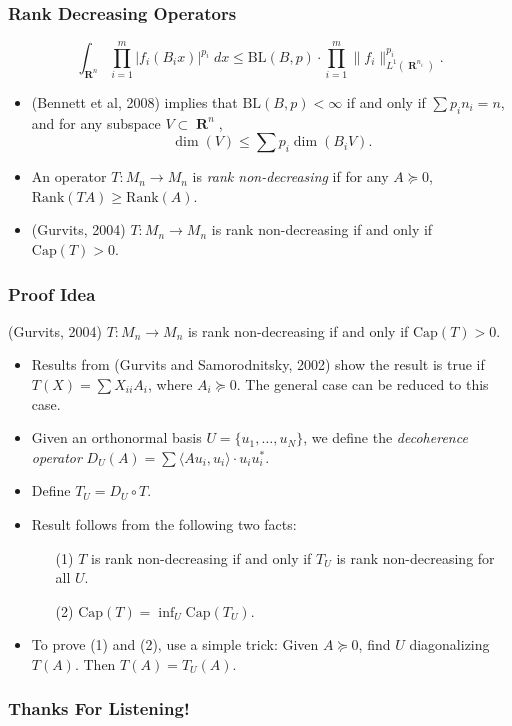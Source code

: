\documentclass[usenames,dvipsnames,12pt]{beamer}
\DeclareMathOperator{\RR}{\mathbf{R}}
\begin{document}
\begin{frame}
    \frametitle{Rank Decreasing Operators}

    \[ \int_{\RR^n} \prod_{i = 1}^m |f_i(B_i x)|^{p_i}\; dx \leq \text{BL}(B,p) \cdot \prod_{i=1}^m \| f_i \|_{L^1(\RR^{n_i})}^{p_i}.  \]

    \begin{itemize}
        \pause
        \item (Bennett et al, 2008) implies that $\text{BL}(B,p) < \infty$ if and only if $\sum p_i n_i = n$, and for any subspace $V \subset \RR^n$,
        \[ \dim(V) \leq \sum p_i \dim(B_i V). \]

        \pause
        \item An operator $T: M_n \to M_n$ is \emph{rank non-decreasing} if for any $A \succeq 0$, $\text{Rank}(TA) \geq \text{Rank}(A)$.

        \pause
        \item (Gurvits, 2004) $T: M_n \to M_n$ is rank non-decreasing if and only if $\text{Cap}(T) > 0$.
    \end{itemize}
\end{frame}


\begin{frame}
    \frametitle{Proof Idea}

    (Gurvits, 2004) $T: M_n \to M_n$ is rank non-decreasing if and only if $\text{Cap}(T) > 0$.

    \begin{itemize}
        \pause
        \item Results from (Gurvits and Samorodnitsky, 2002) show the result is true if $T(X) = \sum X_{ii} A_i$, where $A_i \succeq 0$. The general case can be reduced to this case.

        \pause
        \item Given an orthonormal basis $U = \{ u_1, \dots, u_N \}$, we define the \emph{decoherence operator} $D_U(A) = \sum \langle Au_i, u_i \rangle \cdot u_i u_i^*$.

        \pause
        \item Define $T_U = D_U \circ T$.

        \pause
        \item Result follows from the following two facts:
        \begin{itemize}
            \pause
            \item[(1)] $T$ is rank non-decreasing if and only if $T_U$ is rank non-decreasing for all $U$.
            
            \pause
            \item[(2)] $\text{Cap}(T) = \inf_U \text{Cap}(T_U)$.
        \end{itemize}

        \pause
        \item To prove (1) and (2), use a simple trick: Given $A \succeq 0$, find $U$ diagonalizing $T(A)$. Then $T(A) = T_U(A)$.
    \end{itemize}
\end{frame}


\begin{frame}
    \frametitle{Thanks For Listening!}
\end{frame}
\end{document}
